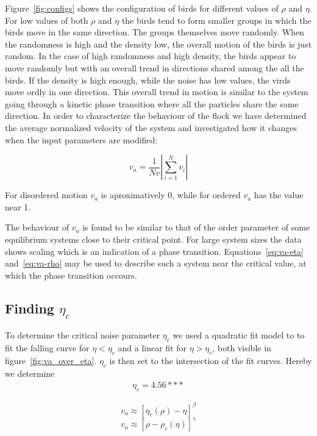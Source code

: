 \documentclass[twoside,twocolumn]{article}
\begin{document}
Figure~\ref{fig:configs} shows the configuration of birds for different values of $\rho$ and $\eta$.  
For low values of both $\rho$ and $\eta$ the birds tend to form smaller groups in which the birds move in the same direction.
The groups themselves move randomly.
When the randomness is high and the density low, the overall motion of the birds is just random.
In the case of high randomness and high density, the birds appear to move randomly but with an overall trend in directions
shared among the all the birds.
If the density is high enough, while the noise has low values, the virds move ordly in one direction.
This overall trend in motion is similar to the system going through a kinetic phase transition
where all the particles share the same direction. In order to characterize the behaviour of the flock
we have determined the average normalized velocity of the system and investigated how it changes when the input parameters are modified:

\begin{equation}
v_a=\frac{1}{Nv}\left\vert\sum_{i=1}^{N} v_i\right\vert
\end{equation}

For disordered motion $v_a$ is aproximatively 0, while for ordered $v_a$ has the value near 1.

The behaviour of $v_a$ is found to be similar to that of the order parameter of some equilibrium systems close to their critical point. For large system sizes the data shows scaling which is an indication of a phase transition. Equations~\eqref{eq:va-eta} and~\eqref{eq:va-rho} may be used to describe such a system near the critical value, at which the phase transition occours. 

\subsection{Finding $\eta_c$}
To determine the critical noise parameter $\eta_c$ we used a quadratic fit model
to to fit the falling curve for $\eta < \eta_c$ and a linear fit for $\eta > 
\eta_c$, both visible in figure~\ref{fig:va_over_eta}. $\eta_c$ is then set to 
the intersection of the fit curves. Hereby we determine
\begin{align}
\eta_c = 4.56***
\end{align}


\begin{equation}
  \label{eq:va-eta}
  v_a \approx{[\eta_c(\rho)-\eta]}^\beta 
\end{equation}
\begin{equation}
  \label{eq:va-rho}
  v_a \approx{\left[\rho-\rho_c (\eta)\right]}^\gamma
\end{equation}
\end{document}
